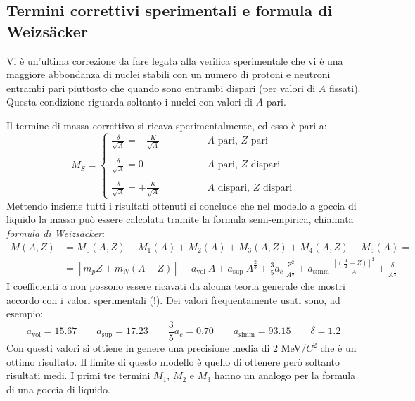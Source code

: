 \subsection{Termini correttivi sperimentali e formula di Weizs\"{a}cker}
Vi è un'ultima correzione da fare legata alla verifica sperimentale che vi è una
maggiore abbondanza di nuclei stabili con un numero di protoni e neutroni
entrambi pari piuttosto che quando sono entrambi dispari (per valori di $A$
fissati). Questa condizione riguarda soltanto i nuclei con valori di $A$ pari.

Il termine di massa correttivo si ricava sperimentalmente, ed esso è pari a:
\begin{equation}
M_S = \begin{cases}
\frac{\delta}{\sqrt{A}} = -\frac{K}{\sqrt{A}} \qquad \qquad &\text{$A$ pari, $Z$ pari}\\
\\
\frac{\delta}{\sqrt{A}} = 0 \qquad \qquad &\text{$A$ pari, $Z$ dispari}\\
\\
\frac{\delta}{\sqrt{A}} = +\frac{K}{\sqrt{A}} \qquad \qquad &\text{$A$ dispari, $Z$ dispari}
\end{cases}
\end{equation}
Mettendo insieme tutti i risultati ottenuti si conclude che nel modello a goccia
di liquido la massa può essere calcolata tramite la formula semi-empirica,
chiamata \textit{formula di Weizs\"{a}cker}:
\begin{equation}
\begin{split}
M{(A, Z)} &= M_0{(A, Z)} - M_1{(A)} + M_2{(A)} + M_3{(A, Z)} + M_4{(A, Z)} + M_5{(A)} =\\
&= \left[ m_p Z + m_N(A-Z) \right] - a_\text{vol}\ A + a_\text{sup}\ A^{\frac{2}{3}} + \frac{3}{5} a_c\ \frac{Z^2}{A^{\frac{1}{3}}} + a_\text{simm}\ \frac{\left[ \left( \frac{A}{2} - Z \right)  \right]^2}{A} + \frac{\delta}{A^{\frac{1}{2}}}
\end{split}
\end{equation}
I coefficienti $a$ non possono essere ricavati da alcuna teoria generale che
mostri accordo con i valori sperimentali (!). Dei valori frequentamente usati
sono, ad esempio:
\begin{equation}
a_\text{vol} = 15.67 \qquad a_\text{sup} = 17.23 \qquad \frac{3}{5} a_c = 0.70 \qquad a_\text{simm} = 93.15 \qquad \delta = 1.2
\end{equation}
Con questi valori si ottiene in genere una precisione media di $2$ MeV/$C^2$ che
è un ottimo risultato. Il limite di questo modello è quello di ottenere però
soltanto risultati medi. I primi tre termini $M_1$, $M_2$ e $M_3$ hanno un
analogo per la formula di una goccia di liquido.


